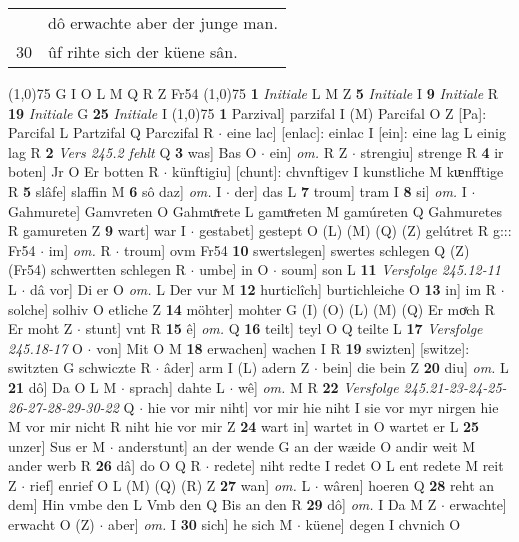 \documentclass[8pt,a4paper,notitlepage]{article}
\begin{document}
\begin{table}[ht]
\begin{minipage}[t]{0.5\linewidth}
\begin{tabular}{rl}
 & dô erwachte aber der junge man.\\ 
30 & ûf rihte sich der küene sân.\\ 
\end{tabular}
\scriptsize
\line(1,0){75} \newline
G I O L M Q R Z Fr54 \newline
\line(1,0){75} \newline
\textbf{1} \textit{Initiale} L M Z  \textbf{5} \textit{Initiale} I  \textbf{9} \textit{Initiale} R  \textbf{19} \textit{Initiale} G  \textbf{25} \textit{Initiale} I  \newline
\line(1,0){75} \newline
\textbf{1} Parzival] parzifal I (M) Parcifal O Z [Pa]: Parcifal L Partzifal Q Parczifal R  $\cdot$ eine lac] [enlac]: einlac I [ein]: eine lag L einig lag R \textbf{2} \textit{Vers 245.2 fehlt} Q  \textbf{3} was] Bas O  $\cdot$ ein] \textit{om.} R Z  $\cdot$ strengiu] strenge R \textbf{4} ir boten] Jr O Er botten R  $\cdot$ künftigiu] [chunt]: chvnftigev I kunstliche M kᵫnfftige R \textbf{5} slâfe] slaffin M \textbf{6} sô daz] \textit{om.} I  $\cdot$ der] das L \textbf{7} troum] tram I \textbf{8} si] \textit{om.} I  $\cdot$ Gahmurete] Gamvreten O Gahmuͯrete L gamuͯreten M gamúreten Q Gahmuretes R gamureten Z \textbf{9} wart] war I  $\cdot$ gestabet] gestept O (L) (M) (Q) (Z) gelútret R g::: Fr54  $\cdot$ im] \textit{om.} R  $\cdot$ troum] ovm Fr54 \textbf{10} swertslegen] swertes schlegen Q (Z) (Fr54) schwertten schlegen R  $\cdot$ umbe] in O  $\cdot$ soum] son L \textbf{11} \textit{Versfolge 245.12-11} L   $\cdot$ dâ vor] Di er O \textit{om.} L Der vur M \textbf{12} hurticlîch] burtichleiche O \textbf{13} in] im R  $\cdot$ solche] solhiv O etliche Z \textbf{14} möhter] mohter G (I) (O) (L) (M) (Q) Er moͯch R Er moht Z  $\cdot$ stunt] vnt R \textbf{15} ê] \textit{om.} Q \textbf{16} teilt] teyl O Q teilte L \textbf{17} \textit{Versfolge 245.18-17} O   $\cdot$ von] Mit O M \textbf{18} erwachen] wachen I R \textbf{19} swizten] [switze]: switzten G schwiczte R  $\cdot$ âder] arm I (L) adern Z  $\cdot$ bein] die bein Z \textbf{20} diu] \textit{om.} L \textbf{21} dô] Da O L M  $\cdot$ sprach] dahte L  $\cdot$ wê] \textit{om.} M R \textbf{22} \textit{Versfolge 245.21-23-24-25-26-27-28-29-30-22} Q   $\cdot$ hie vor mir niht] vor mir hie niht I sie vor myr nirgen hie M vor mir nicht R niht hie vor mir Z \textbf{24} wart in] wartet in O wartet er L \textbf{25} unzer] Sus er M  $\cdot$ anderstunt] an der wende G an der wæide O andir weit M ander werb R \textbf{26} dâ] do O Q R  $\cdot$ redete] niht redte I redet O L ent redete M reit Z  $\cdot$ rief] enrief O L (M) (Q) (R) Z \textbf{27} wan] \textit{om.} L  $\cdot$ wâren] hoeren Q \textbf{28} reht an dem] Hin vmbe den L Vmb den Q Bis an den R \textbf{29} dô] \textit{om.} I Da M Z  $\cdot$ erwachte] erwacht O (Z)  $\cdot$ aber] \textit{om.} I \textbf{30} sich] he sich M  $\cdot$ küene] degen I chvnich O \newline

\end{minipage}
\end{table}
\end{document}
